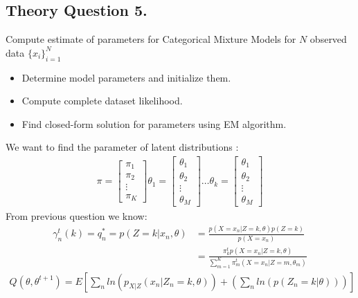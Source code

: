 \documentclass[12pt]{article}
\begin{document}
\subsection{Theory Question 5.}
Compute estimate of parameters for Categorical  Mixture Models for $N$ observed data $\{x_i\}_{i=1}^N$
\begin{itemize}
    \item Determine model parameters and initialize them.
    \item Compute complete dataset likelihood.
    \item Find closed-form solution for parameters using EM algorithm.
\end{itemize}
\begin{qsolve}
    We want to find the parameter of latent distributions :
    \begin{align*}
        \pi= \begin{bmatrix}
            \pi_1  \\
            \pi_2  \\
            \vdots \\
            \pi_K
        \end{bmatrix}
        \theta_1= \begin{bmatrix}
            \theta_1 \\
            \theta_2 \\
            \vdots   \\
            \theta_M
        \end{bmatrix}
        \hdots
        \theta_k= \begin{bmatrix}
            \theta_1 \\
            \theta_2 \\
            \vdots   \\
            \theta_M
        \end{bmatrix}
    \end{align*}
    From previous question we know:
    \begin{align*}
        \gamma_n^t(k)=q_n^*=p(Z=k|x_n,\theta) & =\frac{p(X=x_n|Z=k,\theta)p(Z=k)}{p(X=x_n)}                                 \\
                                              & =	\frac{\pi_k^tp(X=x_n|Z=k,\theta)}{\sum_{m=1}^K\pi_m^t(X=x_n|Z=m,\theta_m)}
    \end{align*}
    \begin{gather*}
        Q(\theta,\theta^{t+1})=E[\sum_nln(p_{X|Z}(x_n|Z_n=k,\theta))+(\sum_nln(p(Z_n=k|\theta)))] \\

\end{gather*}
\end{qsolve}
\end{document}
